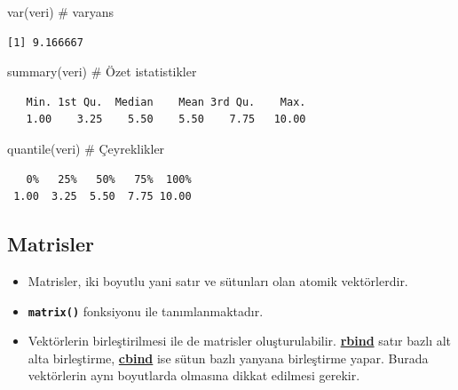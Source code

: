 \documentclass[
  letterpaper,
  DIV=11,
  numbers=noendperiod]{scrreprt}
\newenvironment{Shaded}{\begin{snugshade}}{\end{snugshade}}
\newcommand{\CommentTok}[1]{\textcolor[rgb]{0.37,0.37,0.37}{#1}}
\newcommand{\FunctionTok}[1]{\textcolor[rgb]{0.28,0.35,0.67}{#1}}
\newcommand{\NormalTok}[1]{\textcolor[rgb]{0.00,0.23,0.31}{#1}}
\begin{document}
\begin{Shaded}
\begin{Highlighting}[]
\FunctionTok{var}\NormalTok{(veri) }\CommentTok{\# varyans}
\end{Highlighting}
\end{Shaded}

\begin{verbatim}
[1] 9.166667
\end{verbatim}

\begin{Shaded}
\begin{Highlighting}[]
\FunctionTok{summary}\NormalTok{(veri) }\CommentTok{\# Özet istatistikler}
\end{Highlighting}
\end{Shaded}

\begin{verbatim}
   Min. 1st Qu.  Median    Mean 3rd Qu.    Max. 
   1.00    3.25    5.50    5.50    7.75   10.00 
\end{verbatim}

\begin{Shaded}
\begin{Highlighting}[]
\FunctionTok{quantile}\NormalTok{(veri) }\CommentTok{\# Çeyreklikler}
\end{Highlighting}
\end{Shaded}

\begin{verbatim}
   0%   25%   50%   75%  100% 
 1.00  3.25  5.50  7.75 10.00 
\end{verbatim}

\subsection{Matrisler}\label{matrisler}

\begin{itemize}
\item
  Matrisler, iki boyutlu yani satır ve sütunları olan atomik
  vektörlerdir.
\item
  \textbf{\texttt{matrix()}} fonksiyonu ile tanımlanmaktadır.
\item
  Vektörlerin birleştirilmesi ile de matrisler oluşturulabilir.
  \ul{\textbf{rbind}} satır bazlı alt alta birleştirme,
  \ul{\textbf{cbind}} ise sütun bazlı yanyana birleştirme yapar. Burada
  vektörlerin aynı boyutlarda olmasına dikkat edilmesi gerekir.
\end{itemize}
\end{document}
